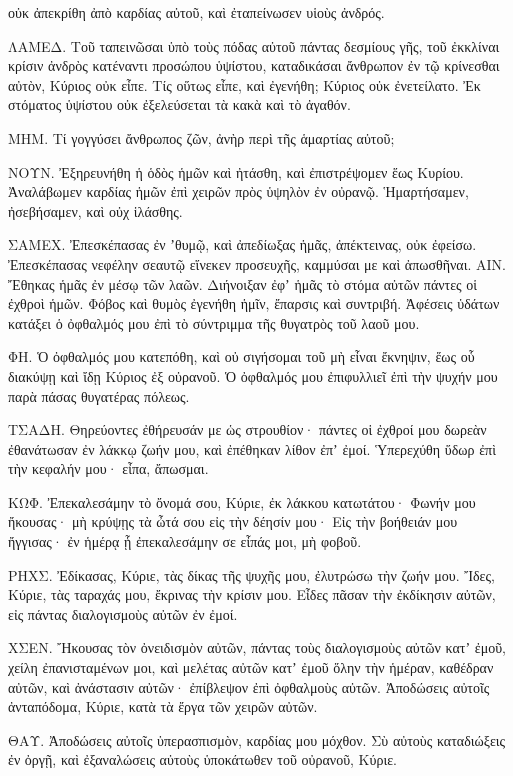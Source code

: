 {οὐκ ἀπεκρίθη ἀπὸ καρδίας αὐτοῦ, καὶ ἐταπείνωσεν υἱοὺς ἀνδρός.
\par }{\PP {}ΛΑΜΕΔ. Τοῦ ταπεινῶσαι ὑπὸ τοὺς πόδας αὐτοῦ πάντας δεσμίους γῆς,
τοῦ ἐκκλίναι κρίσιν ἀνδρὸς κατέναντι προσώπου ὑψίστου,
καταδικάσαι ἄνθρωπον ἐν τῷ κρίνεσθαι αὐτὸν, Κύριος οὐκ εἶπε.
Τίς οὕτως εἶπε, καὶ ἐγενήθη; Κύριος οὐκ ἐνετείλατο.
Ἐκ στόματος ὑψίστου οὐκ ἐξελεύσεται τὰ κακὰ καὶ τὸ ἀγαθόν.
\par }{\PP {}ΜΗΜ. Τί γογγύσει ἄνθρωπος ζῶν, ἀνὴρ περὶ τῆς ἁμαρτίας αὐτοῦ;
\par }{\PP {}ΝΟΥΝ. Ἐξηρευνήθη ἡ ὁδὸς ἡμῶν καὶ ἠτάσθη, καὶ ἐπιστρέψομεν ἕως Κυρίου.
Ἀναλάβωμεν καρδίας ἡμῶν ἐπὶ χειρῶν πρὸς ὑψηλὸν ἐν οὐρανῷ.
Ἡμαρτήσαμεν, ἠσεβήσαμεν, καὶ οὐχ ἱλάσθης.
\par }{\PP {}ΣΑΜΕΧ. Ἐπεσκέπασας ἐν ʼθυμῷ, καὶ ἀπεδίωξας ἡμᾶς, ἀπέκτεινας, οὐκ ἐφείσω.
Ἐπεσκέπασας νεφέλην σεαυτῷ εἵνεκεν προσευχῆς,
καμμύσαι με καὶ ἀπωσθῆναι. ΑΙΝ. Ἔθηκας ἡμᾶς ἐν μέσῳ τῶν λαῶν.
Διήνοιξαν ἐφʼ ἡμᾶς τὸ στόμα αὐτῶν πάντες οἱ ἐχθροὶ ἡμῶν.
Φόβος καὶ θυμὸς ἐγενήθη ἡμῖν, ἔπαρσις καὶ συντριβή.
Ἀφέσεις ὑδάτων κατάξει ὁ ὀφθαλμός μου ἐπὶ τὸ σύντριμμα τῆς θυγατρὸς τοῦ λαοῦ μου.
\par }{\PP {}ΦΗ. Ὁ ὀφθαλμός μου κατεπόθη, καὶ οὐ σιγήσομαι τοῦ μὴ εἶναι ἔκνηψιν,
ἕως οὗ διακύψῃ καὶ ἴδῃ Κύριος ἐξ οὐρανοῦ.
Ὁ ὀφθαλμός μου ἐπιφυλλιεῖ ἐπὶ τὴν ψυχήν μου παρὰ πάσας θυγατέρας πόλεως.
\par }{\PP {}ΤΣΑΔΗ. Θηρεύοντες ἐθήρευσάν με ὡς στρουθίον· πάντες οἱ ἐχθροί μου δωρεὰν
ἐθανάτωσαν ἐν λάκκῳ ζωήν μου, καὶ ἐπέθηκαν λίθον ἐπʼ ἐμοί.
Ὑπερεχύθη ὕδωρ ἐπὶ τὴν κεφαλήν μου· εἶπα, ἄπωσμαι.
\par }{\PP {}ΚΩΦ. Ἐπεκαλεσάμην τὸ ὄνομά σου, Κύριε, ἐκ λάκκου κατωτάτου·
Φωνήν μου ἤκουσας· μὴ κρύψῃς τὰ ὦτά σου εἰς τὴν δέησίν μου·
Εἰς τὴν βοήθειάν μου ἤγγισας· ἐν ἡμέρᾳ ᾗ ἐπεκαλεσάμην σε εἶπάς μοι, μὴ φοβοῦ.
\par }{\PP {}ΡΗΧΣ. Ἐδίκασας, Κύριε, τὰς δίκας τῆς ψυχῆς μου, ἐλυτρώσω τὴν ζωήν μου.
Ἴδες, Κύριε, τὰς ταραχάς μου, ἔκρινας τὴν κρίσιν μου.
Εἶδες πᾶσαν τὴν ἐκδίκησιν αὐτῶν, εἰς πάντας διαλογισμοὺς αὐτῶν ἐν ἐμοί.
\par }{\PP {}ΧΣΕΝ. Ἤκουσας τὸν ὀνειδισμὸν αὐτῶν, πάντας τοὺς διαλογισμοὺς αὐτῶν κατʼ ἐμοῦ,
χείλη ἐπανισταμένων μοι, καὶ μελέτας αὐτῶν κατʼ ἐμοῦ ὅλην τὴν ἡμέραν,
καθέδραν αὐτῶν, καὶ ἀνάστασιν αὐτῶν· ἐπίβλεψον ἐπὶ ὀφθαλμοὺς αὐτῶν.
Ἀποδώσεις αὐτοῖς ἀνταπόδομα, Κύριε, κατὰ τὰ ἔργα τῶν χειρῶν αὐτῶν.
\par }{\PP {}ΘΑΥ. Ἀποδώσεις αὐτοῖς ὑπερασπισμὸν, καρδίας μου μόχθον.
Σὺ αὐτοὺς καταδιώξεις ἐν ὀργῇ, καὶ ἐξαναλώσεις αὐτοὺς ὑποκάτωθεν τοῦ οὐρανοῦ, Κύριε.

}
